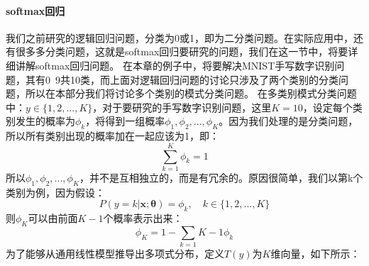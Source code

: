 \documentclass[UTF8]{article}
\begin{document}
\paragraph{softmax回归}
我们之前研究的逻辑回归问题，分类为0或1，即为二分类问题。在实际应用中，还有很多多分类问题，这就是softmax回归要研究的问题，我们在这一节中，将要详细讲解softmax回归问题。\newline
在本章的例子中，将要解决MNIST手写数字识别问题，其有0~9共10类，而上面对逻辑回归问题的讨论只涉及了两个类别的分类问题，所以在本部分我们将讨论多个类别的模式分类问题。\newline
在多类别模式分类问题中：$y \in \{1, 2, ..., K\}$，对于要研究的手写数字识别问题，这里$K=10$，设定每个类别发生的概率为$\phi _{k}$，将得到一组概率$\phi _{1}, \phi _{2}, ..., \phi _{K}$。因为我们处理的是分类问题，所以所有类别出现的概率加在一起应该为1，即：
\begin{equation}
\sum_{k=1}^{K} \phi _{k} = 1
\label{lcrn-multi-class-phi-sum}
\end{equation}
所以$\phi _{1}, \phi _{2}, ..., \phi _{K}$，并不是互相独立的，而是有冗余的。原因很简单，我们以第k个类别为例，因为假设：
\begin{equation}
P(y=k \vert \boldsymbol{x}; \boldsymbol{\theta}) = \phi _{k}, \quad k \in \{1, 2, ..., K\}
\label{lcrn-multi-class-P}
\end{equation}
则$\phi _{K}$可以由前面$K-1$个概率表示出来：
\begin{equation}
\phi _{K} = 1 - \sum_{k=1}{K-1} \phi _{k}
\label{lcrn-multi-class-phi-K-deduction}
\end{equation}
为了能够从通用线性模型推导出多项式分布，定义$T(y)$为$K$维向量，如下所示：
\end{document}
